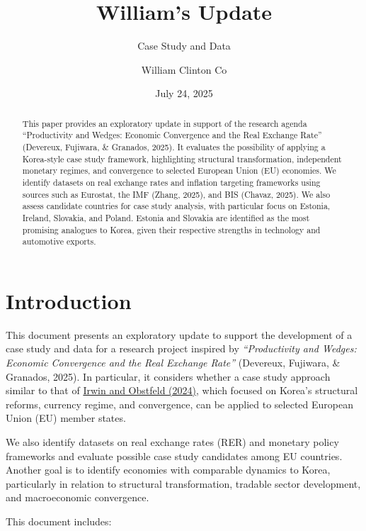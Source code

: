 \documentclass[
  11pt,
]{article}
\title{William's Update}
\subtitle{Case Study and Data}
\author{William Clinton Co}
\date{July 24, 2025}
\renewcommand*\contentsname{Table of contents}
\newcommand\contentsname{Table of contents}
\begin{document}
\maketitle
\begin{abstract}
This paper provides an exploratory update in support of the research
agenda ``Productivity and Wedges: Economic Convergence and the Real
Exchange Rate'' (Devereux, Fujiwara, \& Granados, 2025). It evaluates
the possibility of applying a Korea-style case study framework,
highlighting structural transformation, independent monetary regimes,
and convergence to selected European Union (EU) economies. We identify
datasets on real exchange rates and inflation targeting frameworks using
sources such as Eurostat, the IMF (Zhang, 2025), and BIS (Chavaz, 2025).
We also assess candidate countries for case study analysis, with
particular focus on Estonia, Ireland, Slovakia, and Poland. Estonia and
Slovakia are identified as the most promising analogues to Korea, given
their respective strengths in technology and automotive exports.
\end{abstract}

\renewcommand*\contentsname{Table of contents}
{
\hypersetup{linkcolor=}
\setcounter{tocdepth}{3}
\tableofcontents
}

\section{Introduction}\label{introduction}

This document presents an exploratory update to support the development
of a case study and data for a research project inspired by
\emph{``Productivity and Wedges: Economic Convergence and the Real
Exchange Rate''} (Devereux, Fujiwara, \& Granados, 2025). In particular,
it considers whether a case study approach similar to that of
\href{https://www.nber.org/system/files/working_papers/w32769/w32769.pdf}{Irwin
and Obstfeld (2024)}, which focused on Korea's structural reforms,
currency regime, and convergence, can be applied to selected European
Union (EU) member states.

We also identify datasets on real exchange rates (RER) and monetary
policy frameworks and evaluate possible case study candidates among EU
countries. Another goal is to identify economies with comparable
dynamics to Korea, particularly in relation to structural
transformation, tradable sector development, and macroeconomic
convergence.

This document includes:
\end{document}
